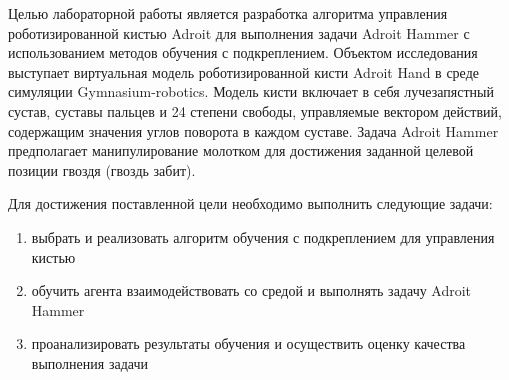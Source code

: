 
Целью лабораторной работы является разработка алгоритма управления роботизированной кистью Adroit 
для выполнения задачи Adroit Hammer с использованием методов обучения с подкреплением. 
Объектом исследования выступает виртуальная модель роботизированной кисти Adroit Hand в среде симуляции Gymnasium-robotics. Модель кисти включает в
себя лучезапястный сустав, суставы пальцев и 24 степени свободы, управляемые вектором действий, содержащим значения углов поворота в каждом суставе.
Задача Adroit Hammer предполагает манипулирование молотком для достижения заданной целевой позиции гвоздя (гвоздь забит).

Для достижения поставленной цели необходимо выполнить следующие задачи:
\begin{enumerate}
    \item выбрать и реализовать алгоритм обучения с подкреплением для управления кистью
    \item обучить агента взаимодействовать со средой и выполнять задачу Adroit Hammer
    \item проанализировать результаты обучения и осуществить оценку качества выполнения задачи
\end{enumerate}

\clearpage
